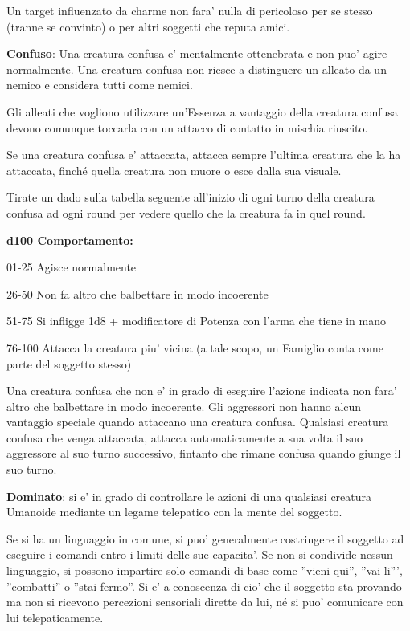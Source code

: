 \documentclass[a4paper,11pt,twoside,openany]{book}
\begin{document}
{Un target influenzato da charme non fara' nulla di pericoloso per se stesso (tranne se convinto) o per altri soggetti che reputa amici.

\textbf{Confuso}: Una creatura confusa e' mentalmente ottenebrata e non puo' agire normalmente. Una creatura confusa non riesce a distinguere un alleato da un nemico e considera tutti come nemici.

Gli alleati che vogliono utilizzare un'Essenza a vantaggio della creatura confusa devono comunque toccarla con un attacco di contatto in mischia riuscito.

Se una creatura confusa e' attaccata, attacca sempre l'ultima creatura che la ha attaccata, finché quella creatura non muore o esce dalla sua visuale.

Tirate un dado sulla tabella seguente all'inizio di ogni turno della
creatura confusa ad ogni round per vedere quello che la creatura fa
in quel round.

\textbf{d100 Comportamento:}

01-25 Agisce normalmente

26-50 Non fa altro che balbettare in modo incoerente

51-75 Si infligge 1d8 + modificatore di Potenza con l'arma che tiene in mano

76-100 Attacca la creatura piu' vicina (a tale scopo, un Famiglio conta come parte del soggetto stesso)

Una creatura confusa che non e' in grado di eseguire l'azione indicata non fara' altro che balbettare in modo incoerente. Gli aggressori non hanno alcun vantaggio speciale quando attaccano una creatura confusa. Qualsiasi creatura confusa che venga attaccata, attacca automaticamente a sua volta il suo aggressore al suo turno successivo, fintanto che rimane confusa quando giunge il suo turno.

\textbf{Dominato}: si e' in grado di controllare le azioni di una qualsiasi creatura Umanoide mediante un legame telepatico con la mente del soggetto.

Se si ha un linguaggio in comune, si puo' generalmente costringere il soggetto ad eseguire i comandi entro i limiti delle sue capacita'. Se non si condivide nessun linguaggio, si possono impartire solo comandi di base come ''vieni qui'', ''vai li''', ''combatti'' o ''stai fermo''. Si e' a conoscenza di cio' che il soggetto sta provando ma non si ricevono percezioni sensoriali dirette da lui, né si puo' comunicare con lui telepaticamente.

}
\end{document}
